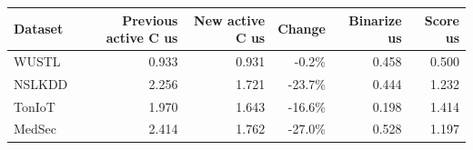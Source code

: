 \begin{tabular}{lrrrrr}
\toprule
Dataset & Previous active C us & New active C us & Change & Binarize us & Score us \\
\midrule
WUSTL & 0.933 & 0.931 & -0.2\% & 0.458 & 0.500 \\
NSLKDD & 2.256 & 1.721 & -23.7\% & 0.444 & 1.232 \\
TonIoT & 1.970 & 1.643 & -16.6\% & 0.198 & 1.414 \\
MedSec & 2.414 & 1.762 & -27.0\% & 0.528 & 1.197 \\
\bottomrule
\end{tabular}
